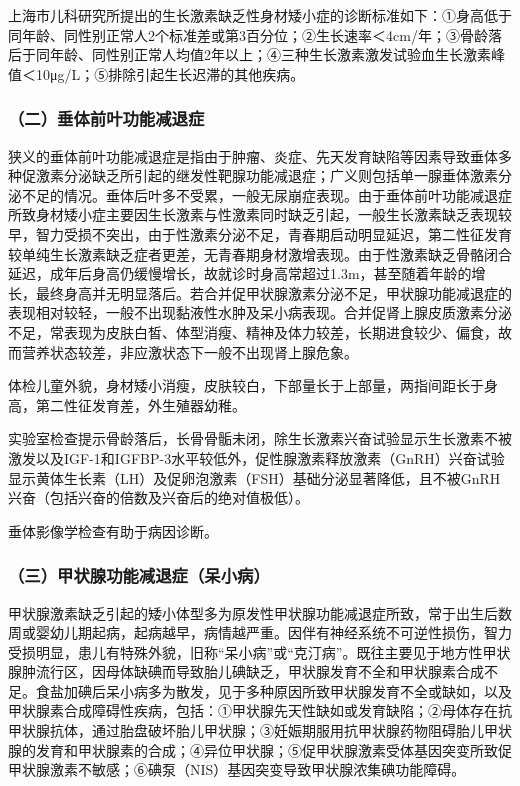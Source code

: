 上海市儿科研究所提出的生长激素缺乏性身材矮小症的诊断标准如下：①身高低于同年龄、同性别正常人2个标准差或第3百分位；②生长速率＜4cm/年；③骨龄落后于同年龄、同性别正常人均值2年以上；④三种生长激素激发试验血生长激素峰值＜10μg/L；⑤排除引起生长迟滞的其他疾病。

\subsubsection{（二）垂体前叶功能减退症}

狭义的垂体前叶功能减退症是指由于肿瘤、炎症、先天发育缺陷等因素导致垂体多种促激素分泌缺乏所引起的继发性靶腺功能减退症；广义则包括单一腺垂体激素分泌不足的情况。垂体后叶多不受累，一般无尿崩症表现。由于垂体前叶功能减退症所致身材矮小症主要因生长激素与性激素同时缺乏引起，一般生长激素缺乏表现较早，智力受损不突出，由于性激素分泌不足，青春期启动明显延迟，第二性征发育较单纯生长激素缺乏症者更差，无青春期身材激增表现。由于性激素缺乏骨骼闭合延迟，成年后身高仍缓慢增长，故就诊时身高常超过1.3m，甚至随着年龄的增长，最终身高并无明显落后。若合并促甲状腺激素分泌不足，甲状腺功能减退症的表现相对较轻，一般不出现黏液性水肿及呆小病表现。合并促肾上腺皮质激素分泌不足，常表现为皮肤白皙、体型消瘦、精神及体力较差，长期进食较少、偏食，故而营养状态较差，非应激状态下一般不出现肾上腺危象。

体检儿童外貌，身材矮小消瘦，皮肤较白，下部量长于上部量，两指间距长于身高，第二性征发育差，外生殖器幼稚。

实验室检查提示骨龄落后，长骨骨骺未闭，除生长激素兴奋试验显示生长激素不被激发以及IGF-1和IGFBP-3水平较低外，促性腺激素释放激素（GnRH）兴奋试验显示黄体生长素（LH）及促卵泡激素（FSH）基础分泌显著降低，且不被GnRH兴奋（包括兴奋的倍数及兴奋后的绝对值极低）。

垂体影像学检查有助于病因诊断。

\subsubsection{（三）甲状腺功能减退症（呆小病）}

甲状腺激素缺乏引起的矮小体型多为原发性甲状腺功能减退症所致，常于出生后数周或婴幼儿期起病，起病越早，病情越严重。因伴有神经系统不可逆性损伤，智力受损明显，患儿有特殊外貌，旧称“呆小病”或“克汀病”。既往主要见于地方性甲状腺肿流行区，因母体缺碘而导致胎儿碘缺乏，甲状腺发育不全和甲状腺素合成不足。食盐加碘后呆小病多为散发，见于多种原因所致甲状腺发育不全或缺如，以及甲状腺素合成障碍性疾病，包括：①甲状腺先天性缺如或发育缺陷；②母体存在抗甲状腺抗体，通过胎盘破坏胎儿甲状腺；③妊娠期服用抗甲状腺药物阻碍胎儿甲状腺的发育和甲状腺素的合成；④异位甲状腺；⑤促甲状腺激素受体基因突变所致促甲状腺激素不敏感；⑥碘泵（NIS）基因突变导致甲状腺浓集碘功能障碍。

